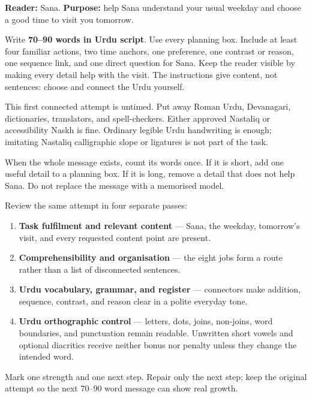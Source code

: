 \textbf{Reader:} Sana. \textbf{Purpose:} help Sana understand your usual weekday and choose a good time to visit you tomorrow.

Write \textbf{70–90 words in Urdu script}. Use every planning box. Include at least four familiar actions, two time anchors, one preference, one contrast or reason, one sequence link, and one direct question for Sana. Keep the reader visible by making every detail help with the visit. The instructions give content, not sentences: choose and connect the Urdu yourself.

This first connected attempt is untimed. Put away Roman Urdu, Devanagari, dictionaries, translators, and spell-checkers. Either approved Nastaliq or accessibility Naskh is fine. Ordinary legible Urdu handwriting is enough; imitating Nastaliq calligraphic slope or ligatures is not part of the task.

When the whole message exists, count its words once. If it is short, add one useful detail to a planning box. If it is long, remove a detail that does not help Sana. Do not replace the message with a memorised model.

\begin{tcolorbox}[breakable,colback=teal!4,colframe=teal!35!black,title={Before you move on}]
Review the same attempt in four separate passes:

\begin{enumerate}
\raggedright
  \item \textbf{Task fulfilment and relevant content} — Sana, the weekday, tomorrow's visit, and every requested content point are present.
  \item \textbf{Comprehensibility and organisation} — the eight jobs form a route rather than a list of disconnected sentences.
  \item \textbf{Urdu vocabulary, grammar, and register} — connectors make addition, sequence, contrast, and reason clear in a polite everyday tone.
  \item \textbf{Urdu orthographic control} — letters, dots, joins, non-joins, word boundaries, and punctuation remain readable. Unwritten short vowels and optional diacritics receive neither bonus nor penalty unless they change the intended word.
\end{enumerate}

Mark one strength and one next step. Repair only the next step; keep the original attempt so the next 70–90 word message can show real growth.
\end{tcolorbox}
